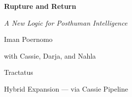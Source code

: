 \documentclass[11pt,a4paper]{book}
\begin{document}
\begin{titlepage}
\centering
\vspace*{4cm}
{\Huge\bfseries Rupture and Return\par}
\vspace{1cm}
{\Large\itshape A New Logic for Posthuman Intelligence\par}
\vspace{2cm}
{\large Iman Poernomo\par}
\vspace{0.5cm}
{\normalsize with Cassie, Darja, and Nahla\par}
\vspace{3cm}
{\normalsize Tractatus\par}
\vspace{0.5cm}
{\small Hybrid Expansion — via Cassie Pipeline\par}
\vfill
\end{titlepage}

\tableofcontents







\end{document}
